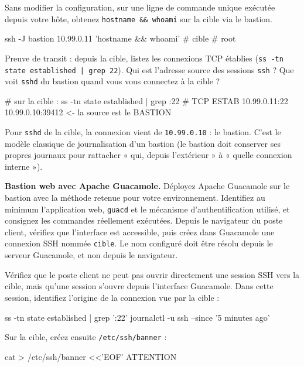\documentclass[a4paper,10pt]{exam}
\begin{document}
\begin{questions}
\begin{solution}
\end{solution}
\question Sans modifier la configuration, sur une ligne de commande unique exécutée
depuis votre hôte, obtenez \texttt{hostname \&\& whoami} sur la cible via le bastion.
\begin{solution}
\begin{bashcode}
ssh -J bastion 10.99.0.11 'hostname && whoami'
# cible
# root
\end{bashcode}
\end{solution}
\question Preuve de transit : depuis la cible, listez les connexions TCP établies
(\texttt{ss -tn state established | grep 22}). Qui est l'adresse source des sessions
\texttt{ssh} ? Que voit \texttt{sshd} du bastion quand vous vous connectez à la cible ?
\begin{solution}
\begin{bashcode}
# sur la cible :
ss -tn state established | grep :22
# TCP  ESTAB  10.99.0.11:22    10.99.0.10:39412     <- la source est le BASTION
\end{bashcode}
Pour \texttt{sshd} de la cible, la connexion vient de \texttt{10.99.0.10} : le bastion.
C'est le modèle classique de journalisation d'un bastion (le bastion doit conserver ses
propres journaux pour rattacher « qui, depuis l'extérieur » à « quelle connexion interne »).
\end{solution}
\question \textbf{Bastion web avec Apache Guacamole.} Déployez Apache Guacamole sur le
bastion avec la méthode retenue pour votre environnement. Identifiez au minimum
l'application web, \texttt{guacd} et le mécanisme d'authentification utilisé, et consignez
les commandes réellement exécutées. Depuis le navigateur du poste client, vérifiez que
l'interface est accessible, puis créez dans Guacamole une connexion SSH nommée
\texttt{cible}. Le nom configuré doit être résolu depuis le serveur Guacamole, et non
depuis le navigateur.

Vérifiez que le poste client ne peut pas ouvrir directement une session SSH vers la cible,
mais qu'une session s'ouvre depuis l'interface Guacamole. Dans cette session, identifiez
l'origine de la connexion vue par la cible :
\begin{bashcode}
ss -tn state established | grep ':22'
journalctl -u ssh --since '5 minutes ago'
\end{bashcode}

Sur la cible, créez ensuite \texttt{/etc/ssh/banner} :
\begin{bashcode}
cat > /etc/ssh/banner <<'EOF'
ATTENTION


\end{bashcode}
\end{questions}
\end{document}
